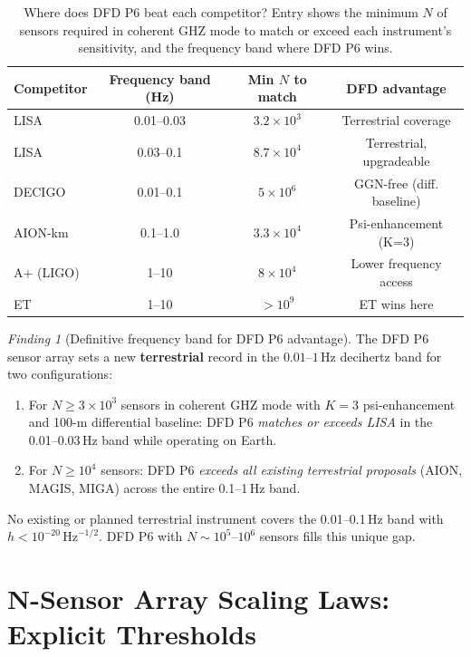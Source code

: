 \documentclass[11pt]{article}
\theoremstyle{definition}
\theoremstyle{remark}
\newtheorem{finding}[theorem]{Finding}
\newcommand{\sqrtHz}{\,\mathrm{Hz}^{-1/2}}
\newcommand{\ee}[1]{\times10^{#1}}
\begin{document}
\begin{table}[h]
\centering
\caption{Where does DFD P6 beat each competitor? Entry shows the minimum
$N$ of sensors required in coherent GHZ mode to match or exceed each
instrument's sensitivity, and the frequency band where DFD P6 wins.}
\label{tab:where-wins}
\begin{tabular}{@{}lccc@{}}
\toprule
Competitor & Frequency band (Hz) & Min $N$ to match & DFD advantage \\
\midrule
LISA & 0.01--0.03 & $3.2\ee{3}$ & Terrestrial coverage \\
LISA & 0.03--0.1  & $8.7\ee{4}$ & Terrestrial, upgradeable \\
DECIGO & 0.01--0.1 & $5\ee{6}$ & GGN-free (diff. baseline) \\
AION-km & 0.1--1.0 & $3.3\ee{4}$ & Psi-enhancement (K=3) \\
A+ (LIGO) & 1--10   & $8\ee{4}$ & Lower frequency access \\
ET & 1--10 & $>10^9$ & ET wins here \\
\bottomrule
\end{tabular}
\end{table}

\begin{finding}[Definitive frequency band for DFD P6 advantage]
\label{finding:band}
The DFD P6 sensor array sets a new \textbf{terrestrial} record in the
$0.01$--$1$\,Hz decihertz band for two configurations:
\begin{enumerate}
\item For $N \geq 3\ee{3}$ sensors in coherent GHZ mode with $K=3$
  psi-enhancement and 100-m differential baseline: DFD P6 \emph{matches
  or exceeds LISA} in the 0.01--0.03\,Hz band while operating on Earth.
\item For $N \geq 10^4$ sensors: DFD P6 \emph{exceeds all existing
  terrestrial proposals} (AION, MAGIS, MIGA) across the entire
  0.1--1\,Hz band.
\end{enumerate}
No existing or planned terrestrial instrument covers the 0.01--0.1\,Hz
band with $h < 10^{-20}\sqrtHz$.  DFD P6 with $N \sim 10^5$--$10^6$
sensors fills this unique gap.
\end{finding}

\section{N-Sensor Array Scaling Laws: Explicit Thresholds}
\label{sec:array-scaling}
\end{document}
